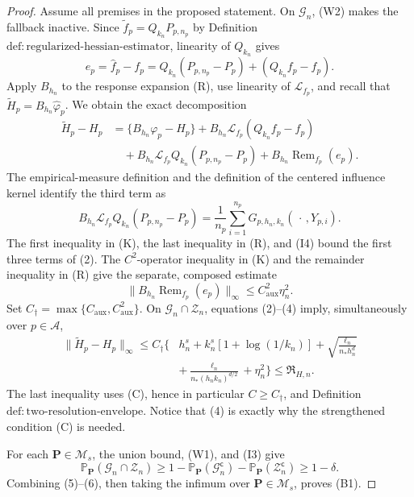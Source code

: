 \documentclass{article}
\begin{document}
\begin{proof}
Assume all premises in the proposed statement.  On \(\mathcal G_n\), (W2) makes the fallback inactive.  Since \(\widetilde f_p=Q_{k_n}P_{p,n_p}\) by Definition \(\mathrm{def:regularized\text{-}hessian\text{-}estimator}\), linearity of \(Q_{k_n}\) gives
\[
 e_p=\widehat f_p-f_p
 =Q_{k_n}(P_{p,n_p}-P_p)+(Q_{k_n}f_p-f_p).
 \tag{1}
\]
Apply \(B_{h_n}\) to the response expansion (R), use linearity of \(\mathscr L_{f_p}\), and recall that \(\widetilde H_p=B_{h_n}\widehat\varphi_p\).  We obtain the exact decomposition
\[
\begin{aligned}
 \widetilde H_p-H_p
 &=\{B_{h_n}\varphi_p-H_p\}
 +B_{h_n}\mathscr L_{f_p}(Q_{k_n}f_p-f_p)\\
 &\quad+B_{h_n}\mathscr L_{f_p}Q_{k_n}(P_{p,n_p}-P_p)
 +B_{h_n}\operatorname{Rem}_{f_p}(e_p).
\end{aligned}
 \tag{2}
\]
The empirical-measure definition and the definition of the centered influence kernel identify the third term as
\[
 B_{h_n}\mathscr L_{f_p}Q_{k_n}(P_{p,n_p}-P_p)
 =\frac1{n_p}\sum_{i=1}^{n_p}G_{p,h_n,k_n}(\,\cdot\,,Y_{p,i}).
 \tag{3}
\]
The first inequality in (K), the last inequality in (R), and (I4) bound the first three terms of (2).  The \(C^2\)-operator inequality in (K) and the remainder inequality in (R) give the separate, composed estimate
\[
 \lVert B_{h_n}\operatorname{Rem}_{f_p}(e_p)\rVert_\infty
 \le C_{\mathrm{aux}}^2\eta_n^2.
 \tag{4}
\]
Set \(C_\dagger=\max\{C_{\mathrm{aux}},C_{\mathrm{aux}}^2\}\).  On \(\mathcal G_n\cap\mathcal Z_n\), equations (2)--(4) imply, simultaneously over \(p\in\mathcal A\),
\[
\begin{aligned}
 \lVert\widetilde H_p-H_p\rVert_\infty
 \le C_\dagger\Bigg\{&h_n^s+k_n^s[1+\log(1/k_n)]
 +\sqrt{\frac{\ell_n}{n_\ast h_n^d}}\\
 &+\frac{\ell_n}{n_\ast(h_nk_n)^{d/2}}+\eta_n^2\Bigg\}
 \le\mathfrak R_{H,n}.
\end{aligned}
 \tag{5}
\]
The last inequality uses (C), hence in particular \(C\ge C_\dagger\), and Definition \(\mathrm{def:two\text{-}resolution\text{-}envelope}\).  Notice that (4) is exactly why the strengthened condition (C) is needed.

For each \(\mathbf P\in\mathcal M_s\), the union bound, (W1), and (I3) give
\[
 \mathbb P_{\mathbf P}(\mathcal G_n\cap\mathcal Z_n)
 \ge1-\mathbb P_{\mathbf P}(\mathcal G_n^{\mathsf c})
       -\mathbb P_{\mathbf P}(\mathcal Z_n^{\mathsf c})
 \ge1-\delta.
 \tag{6}
\]
Combining (5)--(6), then taking the infimum over \(\mathbf P\in\mathcal M_s\), proves (B1).


\end{proof}
\end{document}
